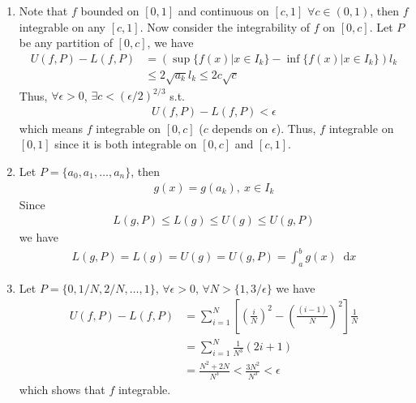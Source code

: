 \documentclass[twoside,11pt]{article}
\renewcommand*\d{\mathop{}\!\mathrm{d}}
\theoremstyle{definition}
\theoremstyle{remark}
\begin{document}
\begin{enumerate}
\item Note that $f$ bounded on $[0,1]$ and  continuous on
$[c, 1]$ $\forall c\in(0,1)$, then $f$ integrable on any
$[c,1]$.
Now consider the integrability of $f$ on $[0,c]$.
Let $P$ be any partition of $[0,c]$, we have
\begin{align*}
    U(f,P) - L(f,P) &= 
    (\sup\{f(x)|x\in I_k\} - \inf\{f(x)|x\in I_k\})l_k\\
    &\leq 2\sqrt{a_k}l_k\leq 2c\sqrt{c}
\end{align*}
Thus, $\forall\epsilon>0$, $\exists c<(\epsilon/2)^{2/3}$ s.t.
\begin{align*}
    U(f,P) - L(f,P) < \epsilon
\end{align*}
which means $f$ integrable on $[0,c]$ ($c$ depends on $\epsilon$).
Thus, $f$ integrable on $[0,1]$ since it is both integrable on
$[0,c]$ and $[c,1]$.



\item Let $P = \{a_0, a_1, \dots, a_n\}$, then
\begin{align*}
    g(x) = g(a_k),\ x\in I_k
\end{align*}
Since 
\begin{align*}
    L(g,P) \leq L(g)\leq U(g)\leq U(g,P)
\end{align*}
we have
\begin{align*}
    L(g,P) = L(g) = U(g) = U(g,P) = \int_a^bg(x)\d x
\end{align*}


\item Let $P = \{0, 1/N, 2/N, \dots, 1\}$, 
$\forall\epsilon>0$, $\forall N>\{1,3/\epsilon\}$ we have
\begin{align*}
    U(f, P) - L(f, P) &= \sum_{i=1}^N
    \left[
        \left(\frac{i}{N}\right)^2 - 
        \left(\frac{(i-1)}{N}\right)^2
    \right]\frac{1}{N}\\
    &=\sum_{i=1}^N\frac{1}{N^3}(2i+1)\\
    &=\frac{N^2 + 2N}{N^3} < \frac{3N^2}{N^3}<\epsilon
\end{align*}
which shows that $f$ integrable.


\end{enumerate}
\end{document}
